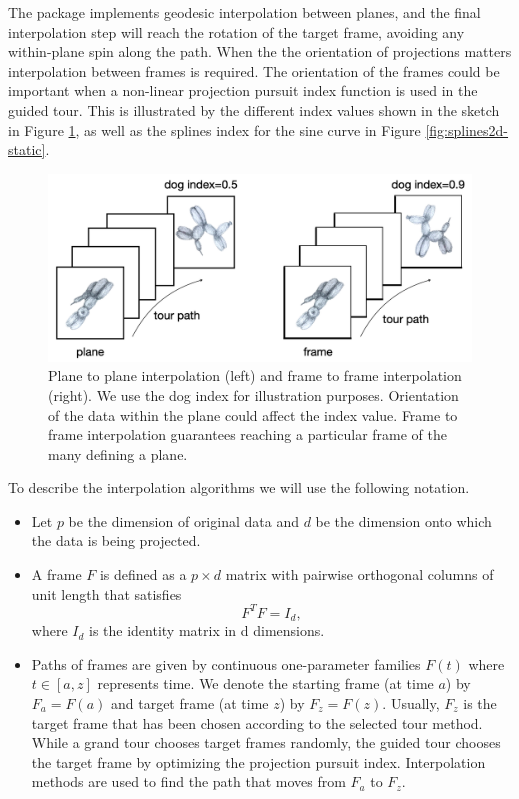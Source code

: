 The  package implements geodesic interpolation between planes, and the final interpolation step will reach the rotation of the target frame, avoiding any within-plane spin along the path. When the the orientation of projections matters interpolation between frames is required. The orientation of the frames could be important when a non-linear projection pursuit index function is used in the guided tour. This is illustrated by the different index values shown in the sketch in Figure \ref{fig:dogs}, as well as the splines index for the sine curve in Figure \ref{fig:splines2d-static}.

\begin{figure}

{\centering \includegraphics[width=1\linewidth]{figures/dog_index} 

}

\caption{Plane to plane interpolation (left) and frame to frame interpolation (right). We use the dog index for illustration purposes. Orientation of the data within the plane could affect the index value. Frame to frame interpolation guarantees reaching a particular frame of the many defining a plane.}\label{fig:dogs}
\end{figure}

To describe the interpolation algorithms we will use the following notation.

\begin{itemize}
\item
  Let \(p\) be the dimension of original data and \(d\) be the dimension onto which the data is being projected.
\item
  A frame \(F\) is defined as a \(p\times d\) matrix with pairwise orthogonal columns of unit length that satisfies
  \[F^TF = I_d,\]
  where \(I_d\) is the identity matrix in d dimensions.
\item
  Paths of frames are given by continuous one-parameter families \(F(t)\) where \(t\in [a, z]\) represents time. We denote the starting frame (at time \(a\)) by \(F_a = F(a)\) and target frame (at time \(z\)) by \(F_z = F(z)\). Usually, \(F_z\) is the target frame that has been chosen according to the selected tour method. While a grand tour chooses target frames randomly, the guided tour chooses the target frame by optimizing the projection pursuit index. Interpolation methods are used to find the path that moves from \(F_a\) to \(F_z\).
\end{itemize}

